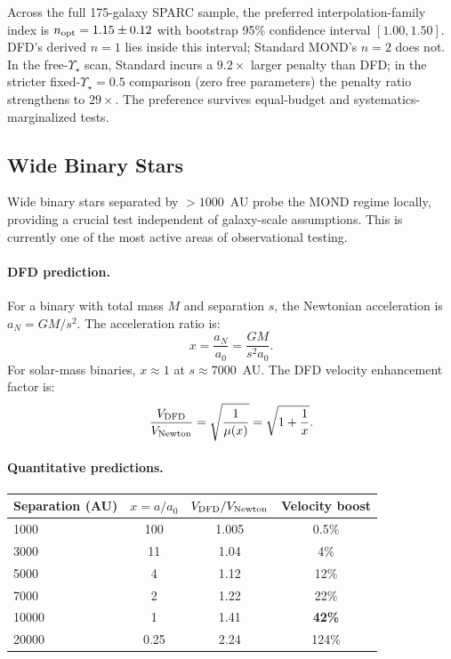 \begin{tcolorbox}[colback=blue!5!white, colframe=blue!60!black, title=SPARC Shape Result]
Across the full 175-galaxy SPARC sample, the preferred interpolation-family index is $n_{\rm opt}=1.15\pm0.12$ with bootstrap 95\% confidence interval $[1.00,1.50]$. DFD's derived $n=1$ lies inside this interval; Standard MOND's $n=2$ does not. In the free-$\Upsilon_\star$ scan, Standard incurs a $9.2\times$ larger penalty than DFD; in the stricter fixed-$\Upsilon_\star=0.5$ comparison (zero free parameters) the penalty ratio strengthens to $29\times$. The preference survives equal-budget and systematics-marginalized tests.
\end{tcolorbox}

\subsection{Wide Binary Stars}\label{sec:galactic-wide-binaries}

Wide binary stars separated by $>1000$~AU probe the MOND regime locally, providing a crucial test independent of galaxy-scale assumptions. This is currently one of the most active areas of observational testing.

\paragraph{DFD prediction.}
For a binary with total mass $M$ and separation $s$, the Newtonian acceleration is $a_N = GM/s^2$. The acceleration ratio is:
\begin{equation}
x = \frac{a_N}{a_0} = \frac{GM}{s^2 a_0}.
\end{equation}
For solar-mass binaries, $x \approx 1$ at $s \approx 7000$~AU. The DFD velocity enhancement factor is:
\begin{equation}
\frac{V_{\rm DFD}}{V_{\rm Newton}} = \sqrt{\frac{1}{\mu(x)}} = \sqrt{1 + \frac{1}{x}}.
\end{equation}

\paragraph{Quantitative predictions.}
\begin{center}
\begin{tabular}{lccc}
\toprule
Separation (AU) & $x = a/a_0$ & $V_{\rm DFD}/V_{\rm Newton}$ & Velocity boost \\
\midrule
1000 & 100 & 1.005 & 0.5\% \\
3000 & 11 & 1.04 & 4\% \\
5000 & 4 & 1.12 & 12\% \\
7000 & 2 & 1.22 & 22\% \\
10000 & 1 & 1.41 & \textbf{42\%} \\
20000 & 0.25 & 2.24 & 124\% \\
\bottomrule
\end{tabular}
\end{center}

